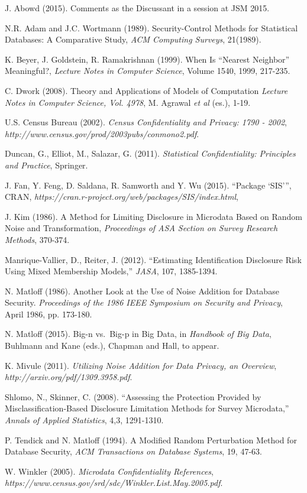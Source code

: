 \documentclass[11pt]{article}
\begin{document}
\begin{thebibliography}{}

 J. Abowd (2015). Comments as the Discussant in a session
at JSM 2015.

N.R. Adam and J.C. Wortmann (1989).
Security-Control Methods for Statistical Databases: A Comparative Study,
{\it ACM Computing Surveys}, 21(1989).

 K. Beyer, J. Goldstein, R. Ramakrishnan (1999).  When Is
``Nearest Neighbor'' Meaningful?, {\it Lecture Notes in Computer
Science}, Volume 1540, 1999, 217-235.

 C. Dwork (2008).  Theory and Applications of Models of
Computation {\it Lecture Notes in Computer Science, Vol. 4978}, M.
Agrawal {\it et al} (es.), 1-19.

 U.S. Census Bureau (2002). 
{\it Census Confidentiality and Privacy: 1790 - 2002},
{\it http://www.census.gov/prod/2003pubs/conmono2.pdf}.

 Duncan, G., Elliot, M., Salazar, G. (2011).  {\it
Statistical Confidentiality: Principles and Practice}, Springer. 

 J. Fan, Y. Feng, D. Saldana, R. Samworth and Y. Wu (2015).
``Package `SIS''', CRAN, {\it
https://cran.r-project.org/web/packages/SIS/index.html},

 J. Kim (1986).  A Method for Limiting Disclosure in
Microdata Based on Random Noise and Transformation, {\it Proceedings of
ASA Section on Survey Research Methods}, 370-374.

 Manrique-Vallier, D., Reiter, J. (2012).
``Estimating Identification Disclosure Risk Using Mixed Membership
Models,'' {\it JASA}, 107, 1385-1394.

 N. Matloff (1986). Another Look at the Use of
Noise Addition for Database Security. {\it Proceedings of the 1986 IEEE
Symposium on Security and Privacy}, April 1986, pp. 173-180.

  N. Matloff (2015).  Big-n vs.\ Big-p in Big Data,
in {\it Handbook of Big Data}, Buhlmann and Kane (eds.), Chapman and
Hall, to appear.

K. Mivule (2011).  {\it Utilizing Noise Addition for Data Privacy, an 
Overview}, {\it http://arxiv.org/pdf/1309.3958.pdf}.

Shlomo, N., Skinner, C. (2008).
``Assessing the Protection Provided by Misclassification-Based Disclosure
Limitation Methods for Survey Microdata,'' {\it Annals of Applied
Statistics}, 4,3, 1291-1310.

 P. Tendick and N. Matloff (1994).  A Modified Random
Perturbation Method for Database Security, {\it ACM Transactions on
Database Systems}, 19, 47-63.


 W. Winkler (2005). {\it Microdata Confidentiality
References}, {\it
https://www.census.gov/srd/sdc/Winkler.List.May.2005.pdf}.

\end{thebibliography}{}
\end{document}
